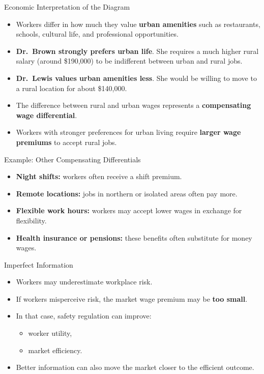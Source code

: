 \documentclass[aspectratio=169]{beamer}
\begin{document}
\begin{frame}{Economic Interpretation of the Diagram}
\transfade

\begin{itemize}

\item Workers differ in how much they value \textbf{urban amenities} such as restaurants, schools, cultural life, and professional opportunities.

\item \textbf{Dr.\ Brown strongly prefers urban life}.  
She requires a much higher rural salary (around \$190,000) to be indifferent between urban and rural jobs.

\item \textbf{Dr.\ Lewis values urban amenities less}.  
She would be willing to move to a rural location for about \$140,000.

\item The difference between rural and urban wages represents a \textbf{compensating wage differential}.

\item Workers with stronger preferences for urban living require \textbf{larger wage premiums} to accept rural jobs.

\end{itemize}

\end{frame}



\begin{frame}{Example: Other Compensating Differentials}
\transfade
\begin{itemize}
  \item \textbf{Night shifts:} workers often receive a shift premium.
  \item \textbf{Remote locations:} jobs in northern or isolated areas often pay more.
  \item \textbf{Flexible work hours:} workers may accept lower wages in exchange for flexibility.
  \item \textbf{Health insurance or pensions:} these benefits often substitute for money wages.
\end{itemize}
\end{frame}

\begin{frame}{Imperfect Information}
\transfade
\begin{itemize}
  \item Workers may underestimate workplace risk.
  \item If workers misperceive risk, the market wage premium may be \textbf{too small}.
  \item In that case, safety regulation can improve:
  \begin{itemize}
    \item worker utility,
    \item market efficiency.
  \end{itemize}
  \item Better information can also move the market closer to the efficient outcome.
\end{itemize}
\end{frame}
\end{document}
